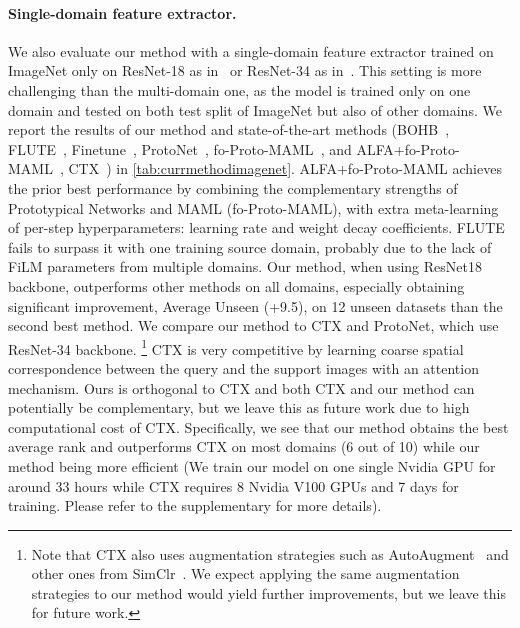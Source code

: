 \paragraph{Single-domain feature extractor.}
We also evaluate our method with a single-domain feature extractor trained on ImageNet only on ResNet-18 as in~\cite{triantafillou2019meta} or ResNet-34 as in~\cite{doersch2020crosstransformers}.
This setting is more challenging than the multi-domain one, as the model is trained only on one domain and tested on both test split of ImageNet but also of other domains.
We report the results of our method and state-of-the-art methods (BOHB~\cite{saikia2020optimized}, FLUTE~\cite{triantafillou2021flute}, Finetune~\cite{triantafillou2019meta}, ProtoNet~\cite{triantafillou2019meta}, fo-Proto-MAML~\cite{triantafillou2019meta}, and ALFA+fo-Proto-MAML~\cite{triantafillou2019meta}, CTX~\cite{doersch2020crosstransformers}) in \cref{tab:currmethodimagenet}.
ALFA+fo-Proto-MAML achieves the prior best performance by combining the complementary strengths of Prototypical Networks and MAML (fo-Proto-MAML), with extra meta-learning of per-step hyperparameters: learning rate and
weight decay coefficients. FLUTE fails to surpass it with one training source domain, probably due to the lack of FiLM parameters from multiple domains.
Our method, when using ResNet18 backbone, outperforms other methods on all domains, especially obtaining significant improvement, \ie Average Unseen (+9.5), on 12 unseen datasets than the second best method.
We compare our method to CTX and ProtoNet, which use ResNet-34 backbone.
\footnote{Note that CTX also uses augmentation strategies such as AutoAugment~\cite{cubuk2019autoaugment} and other ones from SimClr~\cite{chen2020simple}. We expect applying the same augmentation strategies to our method would yield further improvements, but we leave this for future work.}
CTX is very competitive by learning coarse spatial correspondence between the query and the support images with an attention mechanism. Ours is orthogonal to CTX and both CTX and our method can potentially be complementary, but we leave this as future work due to high computational cost of CTX.
Specifically,
we see that our method obtains the best average rank and outperforms CTX on most domains (6 out of 10) while our method being more efficient (We train our model on one single Nvidia GPU for around 33 hours while CTX requires 8 Nvidia V100 GPUs and 7 days for training. Please refer to the supplementary for more details). 





